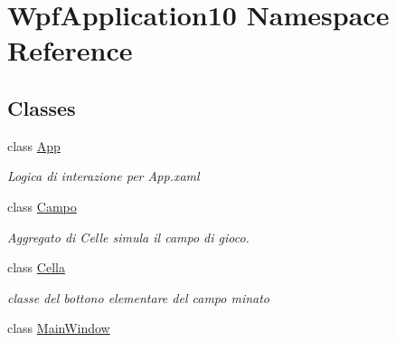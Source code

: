 \hypertarget{namespace_wpf_application10}{}\section{Wpf\+Application10 Namespace Reference}
\label{namespace_wpf_application10}
\subsection*{Classes}
\begin{DoxyCompactItemize}
\item 
class \hyperlink{class_wpf_application10_1_1_app}{App}
\begin{DoxyCompactList}\small\item\em Logica di interazione per App.\+xaml \end{DoxyCompactList}\item 
class \hyperlink{class_wpf_application10_1_1_campo}{Campo}
\begin{DoxyCompactList}\small\item\em Aggregato di Celle simula il campo di gioco. \end{DoxyCompactList}\item 
class \hyperlink{class_wpf_application10_1_1_cella}{Cella}
\begin{DoxyCompactList}\small\item\em classe del bottono elementare del campo minato \end{DoxyCompactList}\item 
class \hyperlink{class_wpf_application10_1_1_main_window}{Main\+Window}
\end{DoxyCompactItemize}
